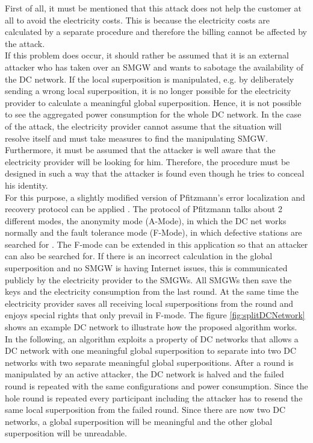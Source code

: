 First of all, it must be mentioned that this attack does not help the customer at all to avoid the electricity costs. This is because the electricity costs are calculated by a separate procedure and therefore the billing cannot be affected by the attack.\\ If this problem does occur, it should rather be assumed that it is an external attacker who has taken over an SMGW and wants to sabotage the availability of the DC network.
If the local superposition is manipulated, e.g. by deliberately sending a wrong local superposition, it is no longer possible for the electricity provider to calculate a meaningful global superposition. Hence, it is not possible to see the aggregated power consumption for the whole DC network. In the case of the attack, the electricity provider cannot assume that the situation will resolve itself and must take measures to find the manipulating SMGW. Furthermore, it must be assumed that the attacker is well aware that the electricity provider will be looking for him. Therefore, the procedure must be designed in such a way that the attacker is found even though he tries to conceal his identity.\\
For this purpose, a slightly modified version of Pfitzmann's error localization and recovery protocol can be applied \cite{pfitzmann2006security}. The protocol of Pfitzmann talks about 2 different modes, the anonymity mode (A-Mode), in which the DC net works normally and the fault tolerance mode (F-Mode), in which defective stations are searched for .
The F-mode can be extended in this application so that an attacker can also be searched for. If there is an incorrect calculation in the global superposition and no SMGW is having Internet issues, this is communicated publicly by the electricity provider to the SMGWs. All SMGWs then save the keys and the electricity consumption from the last round. At the same time the electricity provider saves all receiving local superpositions from the round and enjoys special rights that only prevail in F-mode. The figure \ref{fig:splitDCNetwork} shows an example DC network to illustrate how the proposed algorithm works.\\
In the following, an algorithm exploits a property of DC networks that allows a DC network with one meaningful global superposition to separate into two DC networks with two separate meaningful global superpositions.
After a round is manipulated by an active attacker, the DC network is halved and the failed round is repeated with the same configurations and power consumption. Since the hole round is repeated every participant including the attacker has to resend the same local superposition from the failed round. Since there are now two DC networks, a global superposition will be meaningful and the other global superposition will be unreadable. 

